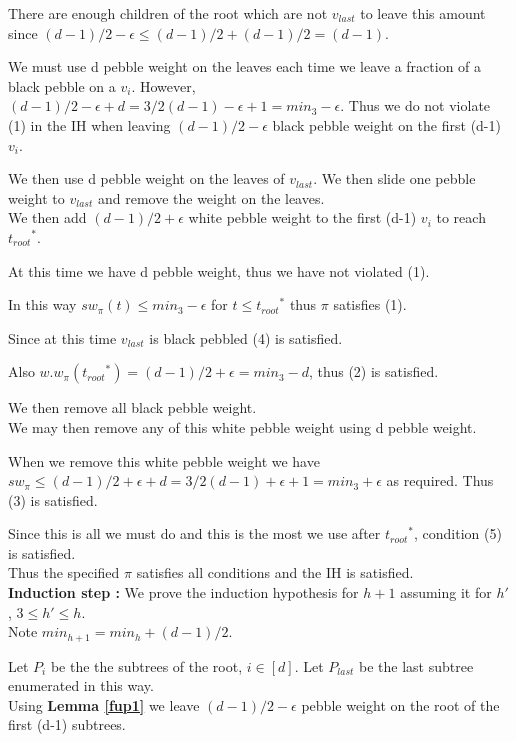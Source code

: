 \documentclass[12pt]{article}
\newcommand{\troots}{{t_{root}}^*}
\begin{document}
There are enough children of the root which are not $v_{last}$ to leave this amount since $(d-1)/2-\epsilon \leq (d-1)/2+(d-1)/2 = (d-1)$. 

We must use d pebble weight on the leaves each time we leave a fraction of a black pebble on a $v_i$. However, $(d-1)/2 -\epsilon + d = 3/2(d-1) -\epsilon + 1 = min_3 -\epsilon$. Thus we do not violate (1) in the IH when leaving $(d-1)/2-\epsilon$ black pebble weight on the first (d-1) $v_i$.

We then use d pebble weight on the leaves of $v_{last}$. We then slide one pebble weight to $v_{last}$ and remove the weight on the leaves.\\

We then add $(d-1)/2 + \epsilon$ white pebble weight to the first (d-1) $v_i$ to reach $\troots$.

At this time we have d pebble weight, thus we have not violated (1).

In this way $sw_\pi(t) \leq min_3-\epsilon$ for $t \leq \troots$ thus $\pi$ satisfies (1).

Since at this time $v_{last}$ is black pebbled (4) is satisfied.

Also $w.w_\pi(\troots) = (d-1)/2 + \epsilon = min_3 - d$, thus (2) is satisfied.

We then remove all black pebble weight.\\

We may then remove any of this white pebble weight using d pebble weight.

When we remove this white pebble weight we have $sw_\pi \leq (d-1)/2 + \epsilon + d = 3/2(d-1) + \epsilon + 1 = min_3 + \epsilon$ as required. Thus (3) is satisfied. 

Since this is all we must do and this is the most we use after $\troots$, condition (5) is satisfied.\\

Thus the specified $\pi$ satisfies all conditions and the IH is satisfied.\\

\noindent
{\bf Induction step :} We prove the induction hypothesis for $h+1$ assuming it for $h'$,
$3\le h' \le h$.\\
Note $min_{h+1} = min_h + (d-1)/2$.

Let $P_i$ be the the subtrees of the root, $i \in [d]$. Let $P_{last}$ be the last subtree enumerated in this way.\\ 

Using {\bf Lemma \ref{fup1}} we leave $(d-1)/2 - \epsilon$ pebble weight on the root of the first (d-1) subtrees.
\end{document}
